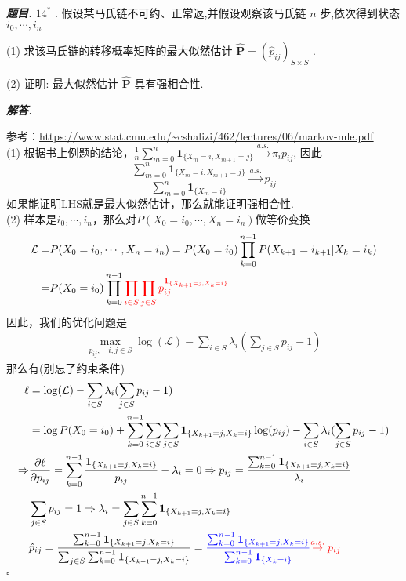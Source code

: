 \documentclass[10pt, a4paper, oneside]{ctexart}
\newenvironment{problem}{\begin{framed}\par\noindent\textbf{\textit{题目. }}}{\end{framed}\par}
\newenvironment{solution}{%
  \par\noindent\textbf{\textit{解答. }}\ignorespaces
}{%
  \hfill\ensuremath{\square}\par %
}
\begin{document}
\begin{problem}
    \( {14}^{ * } \) . 假设某马氏链不可约、正常返,并假设观察该马氏链 \( n \) 步,依次得到状态 \( {i}_{0},\cdots ,{i}_{n} \)

(1) 求该马氏链的转移概率矩阵的最大似然估计 \( \widehat{\mathbf{P}} = {\left( {\widehat{p}}_{ij}\right) }_{S \times  S} \) .

(2) 证明: 最大似然估计 \( \widehat{\mathbf{P}} \) 具有强相合性.
\end{problem}

\begin{solution}
    参考：\url{https://www.stat.cmu.edu/~cshalizi/462/lectures/06/markov-mle.pdf}\\
    (1) 根据书上例题的结论，$\frac{1}{n}\sum_{m=0}^{n}\mathbf{1}_{\{X_m=i,X_{m+1}=j\}}\overset{a.s.}{\to}\pi_ip_{ij}$, 因此
    $$\frac{\sum_{m=0}^{n}\mathbf{1}_{\{X_m=i,X_{m+1}=j\}}}{\sum_{m=0}^{n}\mathbf{1}_{\{X_m=i\}}}\overset{a.s.}{\to}p_{ij}$$
    如果能证明LHS就是最大似然估计，那么就能证明强相合性.\\
    (2) 样本是$i_0,\cdots,i_n$，那么对$P(X_0=i_0,\cdots,X_n=i_n)$做等价变换 
    \begin{align*}
        \mathcal{L}=&P(X_0=i_0,\cdots,X_n=i_n)=P(X_0=i_0)\prod_{k=0}^{n-1}P(X_{k+1}=i_{k+1}|X_k=i_k)\\=&P(X_0=i_0)\prod_{k=0}^{n-1}\textcolor{red}{\prod_{i\in S}\prod_{j\in S}p_{ij}^{\mathbf{1}_{\{X_{k+1}=j,X_k=i\}}}}\\
    \end{align*}
    因此，我们的优化问题是 
    \begin{align*}
        \max_{p_{ij},\quad i,j \in S} \log(\mathcal{L}) -\sum_{i\in S}\lambda_i(\sum_{j\in S}p_{ij}-1)
    \end{align*}
    那么有(别忘了约束条件)
    \begin{align*}
        \ell&=\log(\mathcal{L}) -\sum_{i\in S}\lambda_i(\sum_{j\in S}p_{ij}-1)\\
        &=\log P(X_0=i_0)+\sum_{k=0}^{n-1}\sum_{i\in S}\sum_{j\in S}\mathbf{1}_{\{X_{k+1}=j,X_k=i\}} \log (p_{ij})-\sum_{i\in S}\lambda_i(\sum_{j\in S}p_{ij}-1)\\
        \Rightarrow& \frac{\partial \ell}{\partial p_{ij}}=\sum_{k=0}^{n-1}\frac{\mathbf{1}_{\{X_{k+1}=j,X_k=i\}}}{p_{ij}}-\lambda_i=0 \Rightarrow p_{ij}=\frac{\sum_{k=0}^{n-1}\mathbf{1}_{\{X_{k+1}=j,X_k=i\}}}{\lambda_i}\\
        &\sum_{j\in S}p_{ij}=1\Rightarrow \lambda_i = \sum_{j\in S}\sum_{k=0}^{n-1}\mathbf{1}_{\{X_{k+1}=j,X_k=i\}}\\ 
        &\hat{p}_{ij}=\frac{\sum_{k=0}^{n-1}\mathbf{1}_{\{X_{k+1}=j,X_k=i\}}}{\sum_{j\in S}\sum_{k=0}^{n-1}\mathbf{1}_{\{X_{k+1}=j,X_k=i\}}}=\textcolor{blue}{\frac{\sum_{k=0}^{n-1}\mathbf{1}_{\{X_{k+1}=j,X_k=i\}}}{\sum_{k=0}^{n-1}\mathbf{1}_{\{X_k=i\}}}} \textcolor{red}{\overset{a.s.}{\to}p_{ij}}
    \end{align*}
\end{solution}
\end{document}
